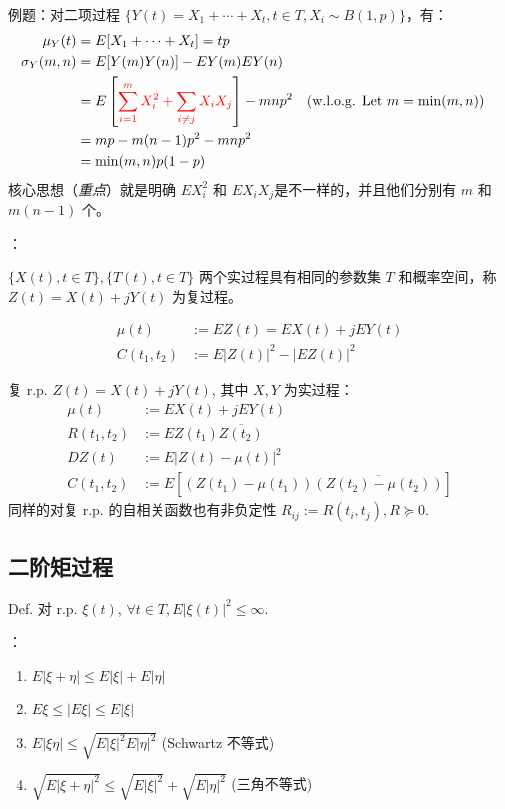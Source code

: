 
例题：对二项过程 $\{Y(t) = X_1 + \cdots + X_t, t \in T, X_i \sim B(1, p)\}$，有：
\begin{align*}
	\mu_Y(t) &= E[X_1+\cdots + X_t] = tp \\
	\sigma_Y(m,n) &= E[Y(m)Y(n)] - EY(m)EY(n) \\
	&= E\left[\textcolor{red}{\sum_{i=1}^{m} X_i^2 + \sum_{i\ne j}X_i X_j}\right] - mnp^2 &&(\text{w.l.o.g. Let } m = \min(m,n))\\
	&= mp - m(n-1)p^2 - mnp^2 \\
	&= \min(m,n)p(1-p)
\end{align*}
核心思想（\emph{重点}）就是明确 $EX_i^2$ 和 $EX_iX_j$是不一样的，并且他们分别有 $m$ 和 $m(n-1)$ 个。

：

$\{X(t), t \in T\}, \{T(t), t \in T\}$ 两个实过程具有相同的参数集 $T$ 和概率空间，称 $Z(t) = X(t) + jY(t)$ 为复过程。

\begin{align*}
	\mu(t) &:= EZ(t) = EX(t) + jEY(t) \\
	C(t_1,t_2) &:= E|Z(t)|^2 - |EZ(t)|^2
\end{align*}

复 r.p. $Z(t) = X(t) +j Y(t)$, 其中 $X,Y$ 为实过程：
\begin{align*}
	\mu(t) &:= EX(t) + jEY(t) \\
	R(t_1,t_2) &:= EZ(t_1)\overline{Z(t_2)} \\
	DZ(t) &:= E|Z(t) - \mu(t)|^2 \\
	C(t_1,t_2) &:= E[(Z(t_1) - \mu(t_1))\overline{(Z(t_2) - \mu(t_2))}]
\end{align*}
同样的对复 r.p. 的自相关函数也有非负定性 $R_{ij}:= R(t_i,t_j), R \succeq 0$.

\subsection{二阶矩过程}

Def. 对 r.p. $\xi(t)$, $\forall t \in T, E|\xi(t)|^2 \le \infty$.

：
\begin{enumerate}
	\item $E|\xi + \eta| \le E|\xi| + E|\eta|$
	\item $E\xi \le |E\xi| \le E|\xi|$
	\item $E|\xi\eta| \le \sqrt{E|\xi|^2E|\eta|^2}$ (Schwartz 不等式)
	\item $\sqrt{E|\xi+\eta|^2} \le \sqrt{E|\xi|^2} + \sqrt{E|\eta|^2}$ (三角不等式)
\end{enumerate}

